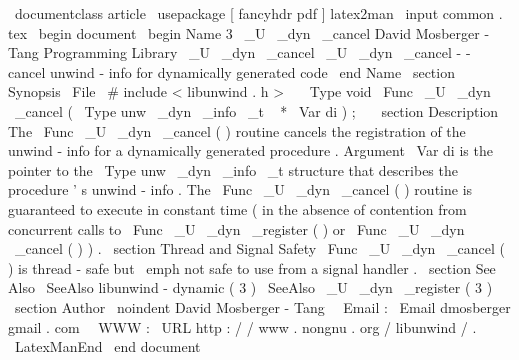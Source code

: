 \
documentclass
{
article
}
\
usepackage
[
fancyhdr
pdf
]
{
latex2man
}
\
input
{
common
.
tex
}
\
begin
{
document
}
\
begin
{
Name
}
{
3
}
{
\
_U
\
_dyn
\
_cancel
}
{
David
Mosberger
-
Tang
}
{
Programming
Library
}
{
\
_U
\
_dyn
\
_cancel
}
\
_U
\
_dyn
\
_cancel
-
-
cancel
unwind
-
info
for
dynamically
generated
code
\
end
{
Name
}
\
section
{
Synopsis
}
\
File
{
\
#
include
<
libunwind
.
h
>
}
\
\
\
Type
{
void
}
\
Func
{
\
_U
\
_dyn
\
_cancel
}
(
\
Type
{
unw
\
_dyn
\
_info
\
_t
~
*
}
\
Var
{
di
}
)
;
\
\
\
section
{
Description
}
The
\
Func
{
\
_U
\
_dyn
\
_cancel
}
(
)
routine
cancels
the
registration
of
the
unwind
-
info
for
a
dynamically
generated
procedure
.
Argument
\
Var
{
di
}
is
the
pointer
to
the
\
Type
{
unw
\
_dyn
\
_info
\
_t
}
structure
that
describes
the
procedure
'
s
unwind
-
info
.
The
\
Func
{
\
_U
\
_dyn
\
_cancel
}
(
)
routine
is
guaranteed
to
execute
in
constant
time
(
in
the
absence
of
contention
from
concurrent
calls
to
\
Func
{
\
_U
\
_dyn
\
_register
}
(
)
or
\
Func
{
\
_U
\
_dyn
\
_cancel
}
(
)
)
.
\
section
{
Thread
and
Signal
Safety
}
\
Func
{
\
_U
\
_dyn
\
_cancel
}
(
)
is
thread
-
safe
but
\
emph
{
not
}
safe
to
use
from
a
signal
handler
.
\
section
{
See
Also
}
\
SeeAlso
{
libunwind
-
dynamic
(
3
)
}
\
SeeAlso
{
\
_U
\
_dyn
\
_register
(
3
)
}
\
section
{
Author
}
\
noindent
David
Mosberger
-
Tang
\
\
Email
:
\
Email
{
dmosberger
gmail
.
com
}
\
\
WWW
:
\
URL
{
http
:
/
/
www
.
nongnu
.
org
/
libunwind
/
}
.
\
LatexManEnd
\
end
{
document
}
